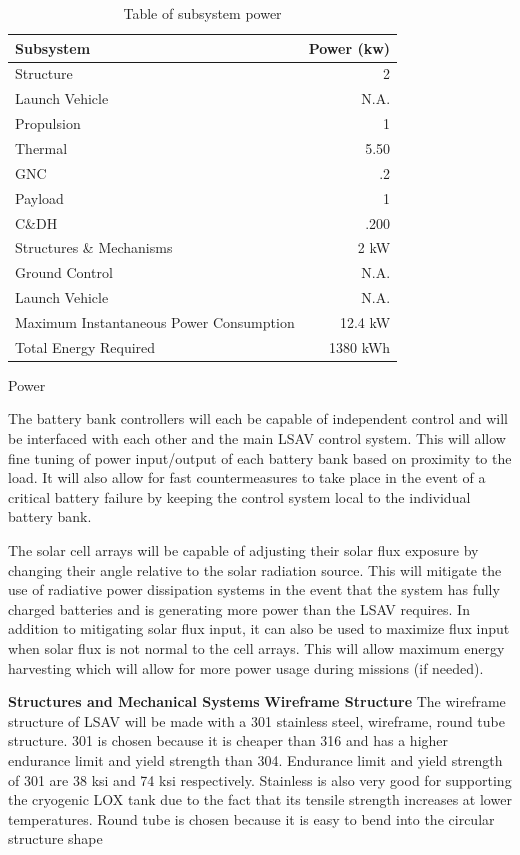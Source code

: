 \documentclass[10pt]{article}
\begin{document}
\begin{table}[H]
  \centering
  \caption{Table of subsystem power}
  \label{table:P}
  \begin{tabular}{p{2in}r} 
    Subsystem & Power (kw) \\ \hline
    Structure & 2 \\ 
    Launch Vehicle & N.A. \\
    Propulsion & 1 \\
    Thermal & 5.50 \\
    GNC & .2 \\
    Payload & 1 \\
    C\&DH & .200 \\
    Structures \& Mechanisms & 2 kW \\
    Ground Control & N.A. \\
    Launch Vehicle & N.A. \\ \hline
    Maximum Instantaneous Power Consumption & 12.4 kW \\ \hline
    Total Energy Required & 1380 kWh \\ 
  \end{tabular}
\end{table}


Power

The battery bank controllers will each be capable of independent
control and will be interfaced with each other and the main LSAV
control system. This will allow fine tuning of power input/output of
each battery bank based on proximity to the load. It will also allow
for fast countermeasures to take place in the event of a critical
battery failure by keeping the control system local to the individual
battery bank.

The solar cell arrays will be capable of adjusting their solar flux
exposure by changing their angle relative to the solar radiation
source. This will mitigate the use of radiative power dissipation
systems in the event that the system has fully charged batteries and
is generating more power than the LSAV requires. In addition to
mitigating solar flux input, it can also be used to maximize flux
input when solar flux is not normal to the cell arrays. This will
allow maximum energy harvesting which will allow for more power usage
during missions (if needed).

\textbf{Structures and Mechanical Systems} 
	\textbf{Wireframe Structure}	The wireframe structure of LSAV will be made with a 301 stainless steel, wireframe, round tube structure.  301 is chosen because it is cheaper than 316 and has a higher endurance limit and yield strength than 304. Endurance limit and yield strength of 301 are 38 ksi and 74 ksi respectively. Stainless is also very good for supporting the cryogenic LOX tank due to the fact that its tensile strength increases at lower temperatures.  Round tube is chosen because it is easy to bend into the circular structure shape
\end{document}
